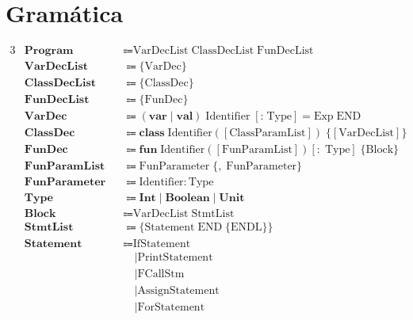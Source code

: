 \documentclass[a4paper,11pt]{article}
\begin{document}
\pagestyle{empty} %

\section*{Gramática}

\begin{alignat*}{3}
&\textbf{Program}      &&\Coloneqq  \text{VarDecList}\;\text{ClassDecList}\;\text{FunDecList} &&\\
&\textbf{VarDecList}   &&\Coloneqq  \lbrace\text{VarDec}\rbrace &&\\
&\textbf{ClassDecList} &&\Coloneqq  \lbrace\text{ClassDec}\rbrace &&\\
&\textbf{FunDecList}   &&\Coloneqq  \lbrace\text{FunDec}\rbrace &&\\
&\textbf{VarDec}       &&\Coloneqq  (\textbf{var}\mid\textbf{val})\;\text{Identifier}\;[\textbf{:}\;\text{Type}] = \text{Exp}\;\text{END} &&\\
&\textbf{ClassDec}     &&\Coloneqq  \textbf{class}\;\text{Identifier}([\text{ClassParamList}])\;\lbrace[\text{VarDecList}]\rbrace &&\\
&\textbf{FunDec}       &&\Coloneqq  \textbf{fun}\;\text{Identifier}([\text{FunParamList}])[:\;\text{Type}]\;\lbrace\text{Block}\rbrace &&\\
&\textbf{FunParamList} &&\Coloneqq  \text{FunParameter}\;\lbrace,\;\text{FunParameter}\rbrace &&\\
&\textbf{FunParameter} &&\Coloneqq  \text{Identifier}:\text{Type} &&\\
&\textbf{Type}         &&\Coloneqq  \textbf{Int}\mid\textbf{Boolean}\mid\textbf{Unit} &&\\
&\textbf{Block}        &&\Coloneqq  \text{VarDecList}\;\text{StmtList} &&\\
&\textbf{StmtList}     &&\Coloneqq  \lbrace\text{Statement}\;\text{END}\;\lbrace \text{ENDL}\rbrace\rbrace &&\\
&\textbf{Statement}    &&\Coloneqq  \text{IfStatement} &&\\
&                       &&\quad\mid  \text{PrintStatement} &&\\
&                       &&\quad\mid  \text{FCallStm} &&\\
&                       &&\quad\mid  \text{AssignStatement} &&\\
&                       &&\quad\mid  \text{ForStatement} &&\\

\end{alignat*}
\end{document}
